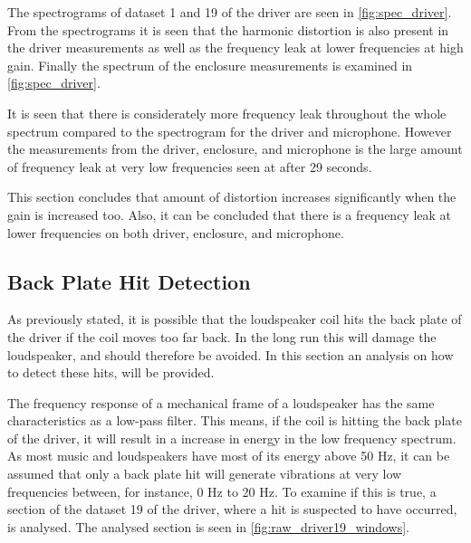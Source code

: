 The spectrograms of dataset 1 and 19 of the driver are seen in \autoref{fig:spec_driver}. From the spectrograms it is seen that the harmonic distortion is also present in the driver measurements as well as the frequency leak at lower frequencies at high gain. Finally the spectrum of the enclosure measurements is examined in \autoref{fig:spec_driver}.

%	
%	

It is seen that there is considerately more frequency leak throughout the whole spectrum compared to the spectrogram for the driver and microphone. However the measurements from the driver, enclosure, and microphone is the large amount of frequency leak at very low frequencies seen at after 29 seconds.

This section concludes that amount of distortion increases significantly when the gain is increased too. Also, it can be concluded that there is a frequency leak at lower frequencies on both driver, enclosure, and microphone. 



\subsection{Back Plate Hit Detection}\label{sec:hit_detect}

As previously stated, it is possible that the loudspeaker coil hits the back plate of the driver if the coil moves too far back. In the long run this will damage the loudspeaker, and should therefore be avoided. In this section an analysis on how to detect these hits, will be provided. 

The frequency response of a mechanical frame of a loudspeaker has the same characteristics as a low-pass filter. This means, if the coil is hitting the back plate of the driver, it will result in a increase in energy in the low frequency spectrum. As most music and loudspeakers have most of its energy above 50 Hz, it can be assumed that only a back plate hit will generate vibrations at very low frequencies between, for instance, 0 Hz to 20 Hz. To examine if this is true, a section of the dataset 19 of the driver, where a hit is suspected to have occurred, is analysed. The analysed section is seen in \autoref{fig:raw_driver19_windows}.


